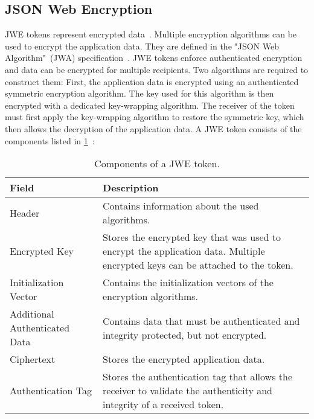 \documentclass[../main.tex]{subfiles}
\begin{document}
\subsection{JSON Web Encryption}
\label{sec:jwe}
JWE tokens represent encrypted data~\cite{JWE2015}.
Multiple encryption algorithms can be used to encrypt the application data.
They are defined in the "JSON Web Algorithm"~(JWA) specification~\cite{JWA2015}.
JWE tokens enforce authenticated encryption and data can be encrypted for multiple recipients.
Two algorithms are required to construct them:
First, the application data is encrypted using an authenticated symmetric encryption algorithm.
The key used for this algorithm is then encrypted with a dedicated key-wrapping algorithm.
The receiver of the token must first apply the key-wrapping algorithm to restore the symmetric key, which then allows the decryption of the application data.
A JWE token consists of the components listed in \cref{tab:jwe}~\cite{JWE2015}:

\begin{table}[ht]
    \centering
    \begin{tabular}{l p{9cm}}
        \hline
    \textbf{Field}                             & \textbf{Description}                                                                                                            \\ \hline
    Header                       & Contains information about the used algorithms.                                                                        \\ 
    Encrypted Key                 & Stores the encrypted key that was used to encrypt the application data. Multiple encrypted keys can be attached to the token.                                               \\ 
    Initialization Vector         & Contains the initialization vectors of the encryption algorithms.                                                     \\ 
    Additional Authenticated Data & Contains data that must be authenticated and integrity protected, but not encrypted.                                   \\ 
    Ciphertext                    & Stores the encrypted application data.                                                                                 \\ 
    Authentication Tag            & Stores the authentication tag that allows the receiver to validate the authenticity and integrity of a received token. \\ \hline
    \end{tabular}
    \caption[Structure of a JWE token]{Components of a JWE token.}
    \label{tab:jwe}
\end{table}
\end{document}
